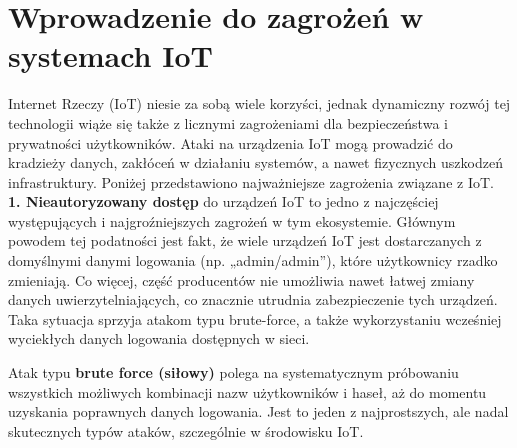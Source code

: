\section{Wprowadzenie do zagrożeń w systemach IoT}
Internet Rzeczy (IoT) niesie za sobą wiele korzyści, jednak dynamiczny rozwój tej technologii wiąże się także z licznymi zagrożeniami dla bezpieczeństwa i prywatności użytkowników. Ataki na urządzenia IoT mogą prowadzić do kradzieży danych, zakłóceń w działaniu systemów, a nawet fizycznych uszkodzeń infrastruktury. Poniżej przedstawiono najważniejsze zagrożenia związane z IoT.
\vspace{10pt} \\
\textbf{1. Nieautoryzowany dostęp} do urządzeń IoT to jedno z najczęściej występujących i najgroźniejszych zagrożeń w tym ekosystemie. Głównym powodem tej podatności jest fakt, że wiele urządzeń IoT jest dostarczanych z domyślnymi danymi logowania (np. „admin/admin”), które użytkownicy rzadko zmieniają. Co więcej, część producentów nie umożliwia nawet łatwej zmiany danych uwierzytelniających, co znacznie utrudnia zabezpieczenie tych urządzeń. Taka sytuacja sprzyja atakom typu brute-force, a także wykorzystaniu wcześniej wyciekłych danych logowania dostępnych w sieci.

Atak typu \textbf{brute force (siłowy)} polega na systematycznym próbowaniu wszystkich możliwych kombinacji nazw użytkowników i haseł, aż do momentu uzyskania poprawnych danych logowania. Jest to jeden z najprostszych, ale nadal skutecznych typów ataków, szczególnie w środowisku IoT.

